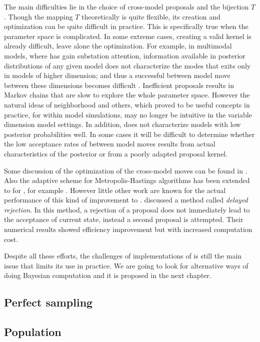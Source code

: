 The main difficulties lie in the choice of cross-model proposals and the
bijection $T$. Though the mapping $T$ theoretically is quite flexible, its
creation and optimization can be quite difficult in practice. This is
specifically true when the parameter space is complicated. In some extreme
cases, creating a valid kernel is already difficult, leave alone the
optimization. For example, in multimodal models, where \rjmcmc has gain
substation attention, information available in posterior distributions of any
given model does not characterize the modes that exits only in models of
higher dimension; and thus a successful between model move between these
dimensions becomes difficult \cite{Jasra:2007id}. Inefficient proposals
results in Markov chains that are slow to explore the whole parameter space.
However the natural ideas of neighborhood and others, which proved to be
useful concepts in practice, for within model simulations, may no longer be
intuitive in the variable dimension model settings. In addition, \rjmcmc does
not characterize models with low posterior probabilities well. In some cases
it will be difficult to determine whether the low acceptance rates of between
model moves results from actual characteristics of the posterior or from a
poorly adapted proposal kernel.

Some discussion of the optimization of the cross-model moves can be found in
\cite{Green:2009tr}. Also the adaptive scheme for Metropolis-Hastings
algorithms has been extended to for \rjmcmc, for example \cite{Hastie:2005vi}.
However little other work are known for the actual performance of this kind of
improvement to \rjmcmc. \cite{Green:2001tk} discussed a method called
\emph{delayed rejection}. In this method, a rejection of a proposal does not
immediately lead to the acceptance of current state, instead a second proposal
is attempted. Their numerical results showed efficiency improvement but with
increased computation cost.

Despite all these efforts, the challenges of implementations of \rjmcmc is
still the main issue that limits its use in practice. We are going to look for
alternative ways of doing Bayesian computation and it is proposed in the next
chapter.

\subsection{Perfect sampling}
\label{sub:Perfect sampling}

\subsection{Population \protect\mcmc}
\label{sub:Population mcmc}

